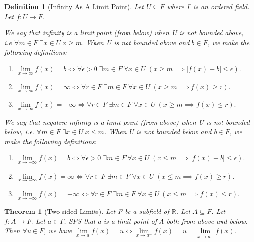 \documentclass[11pt, oneside]{book}
\theoremstyle{break}
\newtheorem{thm}{Theorem}[section]
\newtheorem{defn}{Definition}[section]
\newcommand{\bb}[1]{\mathbb{#1}}		%
\begin{document}
\begin{defn}[Infinity As A Limit Point]
	Let $U \subseteq F$ where F is an ordered field. Let $f: U \to F$.

	We say that infinity is a limit point (from below) when U is not bounded above, i.e $\forall m \in F \; \exists x \in U \; x \geq m$. When U is not bounded above and $b \in F$, we make the following definitions:
	\begin{enumerate}
		\item $\lim\limits_{x \to \infty} f(x) = b \iff \forall \epsilon > 0 \; \exists m \in F \; \forall x \in U \; (x \geq m \implies |f(x) - b| \leq \epsilon).$
		\item $\lim\limits_{x \to \infty} f(x) = \infty \iff \forall r \in F \; \exists m \in F \; \forall x \in U \; (x \geq m \implies f(x) \geq r).$
		\item $\lim\limits_{x \to \infty} f(x) = -\infty \iff \forall r \in F \; \exists m \in F \; \forall x \in U \; (x \geq m \implies f(x) \leq r).$
	\end{enumerate}

	We say that negative infinity is a limit point (from above) when U is not bounded below, i.e. $\forall m \in F \; \exists x \in U \; x \leq m$. When U is not bounded below and $b \in F$, we make the following definitions:
	\begin{enumerate}
		\item $\lim\limits_{x \to -\infty} f(x) = b \iff \forall \epsilon > 0 \; \exists m \in F \; \forall x \in U \; (x \leq m \implies |f(x) - b| \leq \epsilon).$
		\item $\lim\limits_{x \to -\infty} f(x) = \infty \iff \forall r \in F \; \exists m \in F \; \forall x \in U \; (x \leq m \implies f(x) \geq r).$
		\item $\lim\limits_{x \to -\infty} f(x) = -\infty \iff \forall r \in F \; \exists m \in F \; \forall x \in U \; (x \leq m \implies f(x) \leq r).$
	\end{enumerate}
\end{defn}

\begin{thm}[Two-sided Limits]
	Let F be a subfield of $\bb{R}$. Let $A \subseteq F$. Let $f: A \to F$. Let $a \in F$. SPS that a is a limit point of A both from above and below. Then $\forall u \in F$, we have $\lim\limits_{x \to a} f(x) = u \iff \lim\limits_{x \to a^-} f(x) = u = \lim\limits_{x \to a^+} f(x)$.
\end{thm}
\end{document}
